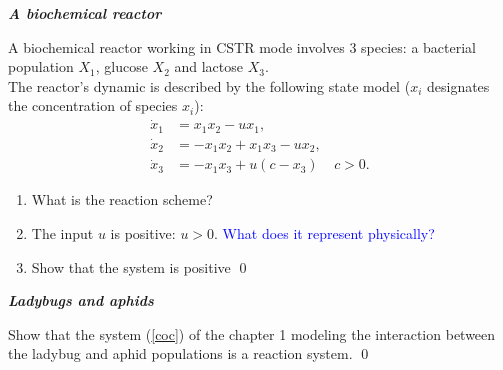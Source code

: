 \begin{exercice}{\bf \em A biochemical reactor}

A biochemical reactor working in CSTR mode involves 3 species: a bacterial population $X_1$, glucose $X_2$ and lactose $X_3$.\\

The reactor’s dynamic is described by the following state model ($x_i$ designates the concentration of species $x_i$):
\begin{equation*} \begin{split}
\dot x_1 &= x_1x_2-ux_1,\\
\dot x_2 &= -x_1x_2 +x_1x_3 -ux_2,\\
\dot x_3 &= -x_1x_3 +u(c-x_3) \;\;\;\; c>0. 
\end{split} \end{equation*}

\begin{enumerate}
\item What is the reaction scheme?
\item The input $u$ is positive: $u>0$. \textcolor{blue}{What does it represent physically?} 
\item Show that the system is positive
 \qed
\end{enumerate}
\end{exercice}
\vv

\begin{exercice}{\bf \em Ladybugs and aphids}

Show that the system (\ref{coc}) of the chapter 1 modeling the interaction between the ladybug and aphid populations is a reaction system. \qed
\end{exercice}
\vv

